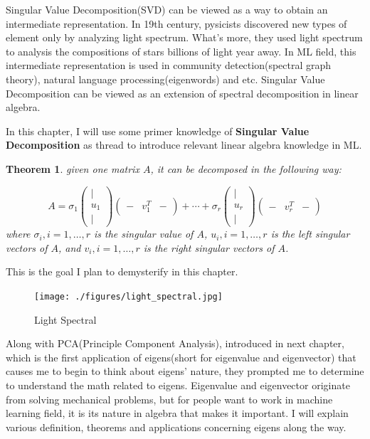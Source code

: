 \documentclass[a4paper]{book}
\newtheorem{theorem}{Theorem}[section]
\begin{document}
  Singular Value Decomposition(SVD) can be viewed as a way to obtain an
  intermediate representation. In 19th century, pysicists discovered new types
  of element only by analyzing light spectrum.  What's more, they used light
  spectrum to analysis the compositions of stars billions of light year away. In
  ML field, this intermediate representation is used in community
  detection(spectral graph theory), natural language processing(eigenwords) and
  etc. Singular Value Decomposition can be viewed as an extension of spectral
  decomposition in linear algebra.

  In this chapter, I will use some primer knowledge of \textbf{Singular Value
    Decomposition} as thread to introduce relevant linear algebra knowledge in
  ML.

  \begin{theorem}
  \label{thm:spectral_theory}
  given one matrix $A$, it can be decomposed in the following way:

  \begin{displaymath}
    A = \sigma_{1}
      \begin{pmatrix}
        | \\
        u_{1} \\
        |
      \end{pmatrix}
    \begin{pmatrix}
      - & v_{1}^{T} & - 
    \end{pmatrix}
      + \cdots + \sigma_{r}
      \begin{pmatrix}
        | \\
        u_{r} \\
        |
      \end{pmatrix}
    \begin{pmatrix}
      - & v_{r}^{T} & - 
    \end{pmatrix}
  \end{displaymath}
  where $\sigma_{i}, i = 1, \ldots, r$ is the singular value of $A$,
  $u_{i}, i = 1, \ldots, r$ is the left singular vectors of $A$, and
  $v_{i}, i = 1, \ldots, r$ is the right singular vectors of $A$.
  \end{theorem}

  This is the goal I plan to demysterify in this chapter.

  \begin{figure}[h]
    \begin{center}
      \texttt{[image: ./figures/light\_spectral.jpg]}
      \caption{Light Spectral\label{fig:light_spectral}}
    \end{center}
  \end{figure}
  Along with PCA(Principle Component Analysis), introduced in next
  chapter, which is the first application of eigens(short for eigenvalue
  and eigenvector) that causes me to begin to think about eigens'
  nature, they prompted me to determine to understand the math related
  to eigens.  Eigenvalue and eigenvector originate from solving
  mechanical problems\cite{Hawkins19751}, but for people want to work in
  machine learning field, it is its nature in algebra that makes it
  important. I will explain various definition, theorems and
  applications concerning eigens along the way.
\end{document}
